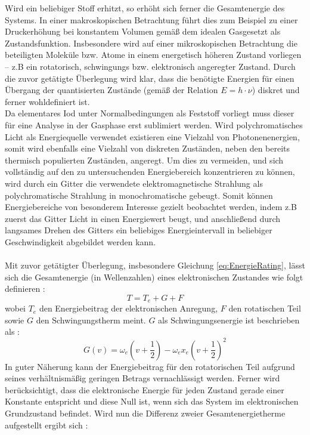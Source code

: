 Wird ein beliebiger Stoff erhitzt, so erhöht sich ferner die Gesamtenergie des Systems. In einer makroskopischen Betrachtung führt dies zum Beispiel zu einer Druckerhöhung bei konstantem Volumen gemäß dem idealen Gasgesetzt als Zustandsfunktion. Insbesondere wird auf einer mikroskopischen Betrachtung die beteiligten Moleküle bzw. Atome in einem energetisch höheren Zustand vorliegen -- z.B ein rotatorisch, schwingungs bzw. elektronisch angeregter Zustand. Durch die zuvor getätigte Überlegung wird klar, dass die benötigte Energien für einen Übergang der quantisierten Zustände (gemäß der Relation $E = h \cdot \nu$) diskret und ferner wohldefiniert ist. \\Da elementares Iod unter Normalbedingungen als Feststoff vorliegt muss dieser für eine Analyse in der Gasphase erst sublimiert werden. Wird polychromatisches Licht als Energiequelle verwendet existieren eine Vielzahl von Photonenenergien, somit wird ebenfalls eine Vielzahl von diskreten Zuständen, neben den bereits thermisch populierten Zuständen, angeregt. Um dies zu vermeiden, und sich vollständig auf den zu untersuchenden Energiebereich konzentrieren zu können, wird durch ein Gitter die verwendete elektromagnetische Strahlung als polychromatische Strahlung in monochromatische gebeugt. Somit können Energiebereiche von besonderem Interesse gezielt beobachtet werden, indem z.B zuerst das Gitter Licht in einen Energiewert beugt, und anschließend durch langsames Drehen des Gitters ein beliebiges Energieintervall in beliebiger Geschwindigkeit abgebildet werden kann.\\
\\
Mit zuvor getätigter Überlegung, insbesondere Gleichung \ref{eq:EnergieRating}, lässt sich die Gesamtenergie (in Wellenzahlen) eines elektronischen Zustandes wie folgt definieren : 
\begin{equation}
T = T_e + G + F
\end{equation}
wobei $T_e$ den Energiebeitrag der elektronischen Anregung, $F$ den rotatischen Teil sowie $G$ den Schwingungstherm meint. $G$ als Schwingungsenergie ist beschrieben  als : 
\begin{equation}
G(v) =  \omega_e \left(v+\frac{1}{2}\right)-\omega_e x_e\left(v+\frac{1}{2}\right)^2
\end{equation}
In guter Näherung kann der Energiebeitrag für den rotatorischen Teil aufgrund seines verhältnismäßig geringen Betrags vernachlässigt werden. Ferner wird berücksichtigt, dass die elektronische Energie für jeden Zustand gerade einer Konstante entspricht und diese Null ist, wenn sich das System im elektronischen Grundzustand befindet. Wird nun die Differenz zweier Gesamtenergietherme aufgestellt ergibt sich : 

